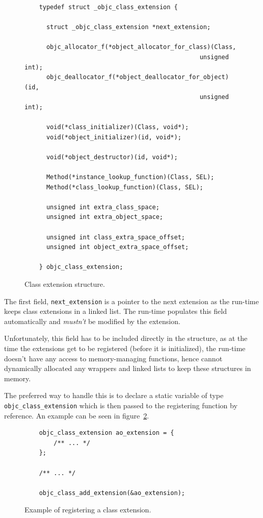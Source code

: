 \begin{figure}[htbp] 
  \begin{verbatim}
    typedef struct _objc_class_extension {

      struct _objc_class_extension *next_extension;
      
      objc_allocator_f(*object_allocator_for_class)(Class,
                                                unsigned int);
      objc_deallocator_f(*object_deallocator_for_object)(id,
                                                unsigned int);
      
      void(*class_initializer)(Class, void*);
      void(*object_initializer)(id, void*);
      
      void(*object_destructor)(id, void*);
        
      Method(*instance_lookup_function)(Class, SEL);
      Method(*class_lookup_function)(Class, SEL);
      
      unsigned int extra_class_space;
      unsigned int extra_object_space;
      
      unsigned int class_extra_space_offset;
      unsigned int object_extra_space_offset;
      
    } objc_class_extension;
  \end{verbatim}
  \centering{}
  \caption{Class extension structure.}
  \label{fig:class_ext_struct}
\end{figure}

The first field, \verb=next_extension= is a pointer to the next extension as the run-time keeps class extensions in a linked list. The run-time populates this field automatically and \emph{mustn't} be modified by the extension. 

Unfortunately, this field has to be included directly in the structure, as at the time the extensions get to be registered (before it is initialized), the run-time doesn't have any access to memory-managing functions, hence cannot dynamically allocated any wrappers and linked lists to keep these structures in memory.

The preferred way to handle this is to declare a static variable of type \newline{}\verb=objc_class_extension= which is then passed to the registering function by reference. An example can be seen in figure~\ref{fig:class_ext_struct_example}.

\begin{figure}[here] 
  \begin{verbatim}
    objc_class_extension ao_extension = { 
        /** ... */ 
    };
    
    /** ... */
    
    objc_class_add_extension(&ao_extension);
  \end{verbatim}
  \centering{}
  \caption{Example of registering a class extension.}
  \label{fig:class_ext_struct_example}
\end{figure}


